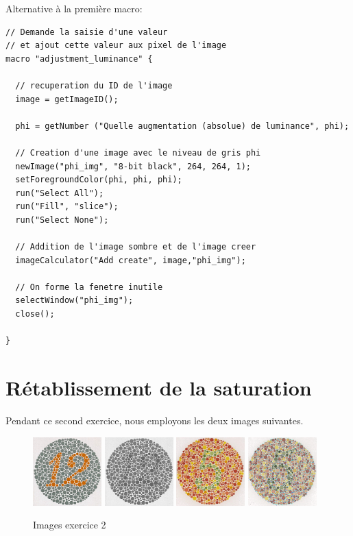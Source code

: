 \documentclass[a4paper,11pt]{article}
\begin{document}
Alternative à la première macro:

\begin{lstlisting}[caption=adjustment\_luminance.ijm]
// Demande la saisie d'une valeur
// et ajout cette valeur aux pixel de l'image
macro "adjustment_luminance" {

  // recuperation du ID de l'image
  image = getImageID();

  phi = getNumber ("Quelle augmentation (absolue) de luminance", phi);

  // Creation d'une image avec le niveau de gris phi
  newImage("phi_img", "8-bit black", 264, 264, 1);
  setForegroundColor(phi, phi, phi);
  run("Select All");
  run("Fill", "slice");
  run("Select None");

  // Addition de l'image sombre et de l'image creer
  imageCalculator("Add create", image,"phi_img");

  // On forme la fenetre inutile
  selectWindow("phi_img");
  close();

}
\end{lstlisting}

\newpage

\section{Rétablissement de la saturation}

Pendant ce second exercice, nous employons les deux images suivantes.

\begin{figure}[H]
  \begin{center}  
    \includegraphics[width=100px]{images/it2_72pp.png}
    \includegraphics[width=100px]{images/it2_72pp_gris.png}
    \includegraphics[width=100px]{images/it3_72pp.png}
    \includegraphics[width=100px]{images/it3_72pp_saturation_faible.png}
    \caption{Images exercice 2}
  \end{center}
\end{figure}
\end{document}
